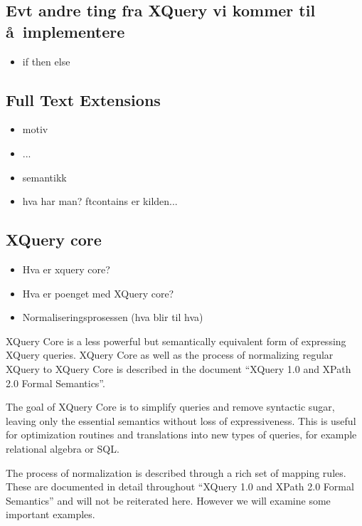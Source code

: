 \subsection{Evt andre ting fra XQuery vi kommer til \aa~implementere}

\begin{itemize}
\item if then else

\end{itemize}

\subsection{Full Text Extensions}

\begin{itemize}
\item motiv
\item ...
\item semantikk
\item hva har man? ftcontains er kilden...
\end{itemize}

\subsection{XQuery core}
\label{sect:theory:xqXQcore}
\begin{itemize}
  \item Hva er xquery core?
  \item Hva er poenget med XQuery core?
  \item Normaliseringsprosessen (hva blir til hva)
\end{itemize}

XQuery Core is a less powerful but semantically equivalent form of expressing
XQuery queries. XQuery Core as well as the process of normalizing regular
XQuery to XQuery Core is described in the document ``XQuery 1.0 and XPath 2.0
Formal Semantics''\cite{xquery_semantics}.

The goal of XQuery Core is to simplify queries and remove syntactic sugar,
leaving only the essential semantics without loss of expressiveness.
This is useful for optimization routines and translations into new types of
queries, for example relational algebra or SQL.

The process of normalization is described through a rich set of mapping
rules. These are documented in detail throughout ``XQuery 1.0 and XPath 2.0
Formal Semantics''\cite{xquery_semantics} and will not be reiterated here.
However we will examine some important examples.

